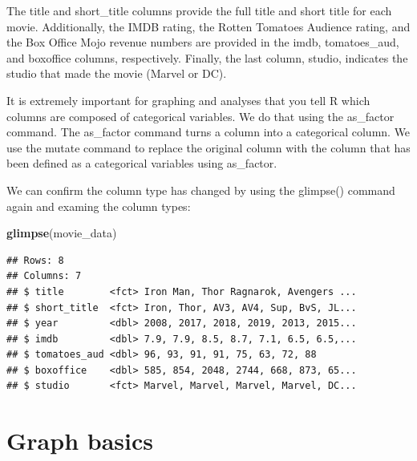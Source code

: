 \documentclass[
]{krantz}
\makeatletter
\newenvironment{Shaded}{\begin{snugshade}}{\end{snugshade}}
\newcommand{\DataTypeTok}[1]{\textcolor[rgb]{0.27,0.27,0.27}{#1}}
\newcommand{\KeywordTok}[1]{\textcolor[rgb]{0.27,0.27,0.27}{\textbf{#1}}}
\newcommand{\NormalTok}[1]{#1}
\newcommand{\OperatorTok}[1]{\textcolor[rgb]{0.43,0.43,0.43}{\textbf{#1}}}
\newcommand{\StringTok}[1]{\textcolor[rgb]{0.5,0.5,0.5}{#1}}
\newenvironment{kframe}{%
\medskip{}
\setlength{\fboxsep}{.8em}
 \def\at@end@of@kframe{}%
 \ifinner\ifhmode%
  \def\at@end@of@kframe{\end{minipage}}%
  \begin{minipage}{\columnwidth}%
 \fi\fi%
 \def\FrameCommand##1{\hskip\@totalleftmargin \hskip-\fboxsep
 \colorbox{shadecolor}{##1}\hskip-\fboxsep
     \hskip-\linewidth \hskip-\@totalleftmargin \hskip\columnwidth}%
 \MakeFramed {\advance\hsize-\width
   \@totalleftmargin\z@ \linewidth\hsize
   \@setminipage}}%
 {\par\unskip\endMakeFramed%
 \at@end@of@kframe}
\renewenvironment{Shaded}{\begin{kframe}}{\end{kframe}}
\makeatother
\begin{document}
The title and short\_title columns provide the full title and short title for each movie. Additionally, the IMDB rating, the Rotten Tomatoes Audience rating, and the Box Office Mojo revenue numbers are provided in the imdb, tomatoes\_aud, and boxoffice columns, respectively. Finally, the last column, studio, indicates the studio that made the movie (Marvel or DC).

It is extremely important for graphing and analyses that you tell R which columns are composed of categorical variables. We do that using the as\_factor command. The as\_factor command turns a column into a categorical column. We use the mutate command to replace the original column with the column that has been defined as a categorical variables using as\_factor.

\begin{Shaded}
\end{Shaded}

We can confirm the column type has changed by using the glimpse() command again and examing the column types:

\begin{Shaded}
\begin{Highlighting}[]
\KeywordTok{glimpse}\NormalTok{(movie_data)}
\end{Highlighting}
\end{Shaded}

\begin{verbatim}
## Rows: 8
## Columns: 7
## $ title        <fct> Iron Man, Thor Ragnarok, Avengers ...
## $ short_title  <fct> Iron, Thor, AV3, AV4, Sup, BvS, JL...
## $ year         <dbl> 2008, 2017, 2018, 2019, 2013, 2015...
## $ imdb         <dbl> 7.9, 7.9, 8.5, 8.7, 7.1, 6.5, 6.5,...
## $ tomatoes_aud <dbl> 96, 93, 91, 91, 75, 63, 72, 88
## $ boxoffice    <dbl> 585, 854, 2048, 2744, 668, 873, 65...
## $ studio       <fct> Marvel, Marvel, Marvel, Marvel, DC...
\end{verbatim}

\hypertarget{graph-basics}{%
\section{Graph basics}\label{graph-basics}}
\end{document}
